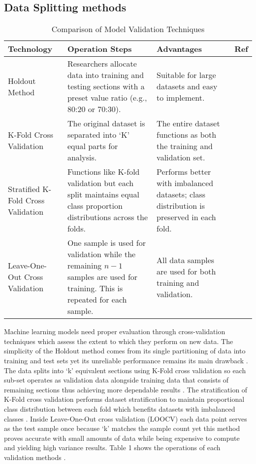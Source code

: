 \documentclass[runningheads]{llncs}
\begin{document}
\subsection{Data Splitting methods}
\begin{table}[h]
\centering
\caption{Comparison of Model Validation Techniques}
\label{tab:model_validation}
\begin{tabular}{|p{3cm}|p{4cm}|p{4cm}|p{1cm}|}
\hline
\textbf{Technology} & \textbf{Operation Steps} & \textbf{Advantages} & \textbf{Ref} \\
\hline
Holdout Method & Researchers allocate data into training and testing sections with a preset value ratio (e.g., 80:20 or 70:30). & Suitable for large datasets and easy to implement. & \cite{kadir2018} \\
\hline
K-Fold Cross Validation & The original dataset is separated into ‘K’ equal parts for analysis. & The entire dataset functions as both the training and validation set. & \cite{qiu2024} \\
\hline
Stratified K-Fold Cross Validation & Functions like K-fold validation but each split maintains equal class proportion distributions across the folds. & Performs better with imbalanced datasets; class distribution is preserved in each fold. & \cite{g2020,kanakaraddi2024} \\
\hline
Leave-One-Out Cross Validation & One sample is used for validation while the remaining \(n-1\) samples are used for training. This is repeated for each sample. & All data samples are used for both training and validation. & \cite{miller2024} \\
\hline
\end{tabular}
\end{table}


Machine learning models need proper evaluation through cross-validation techniques which assess the extent to which they perform on new data. The simplicity of the Holdout method comes from its single partitioning of data into training and test sets yet its unreliable performance remains its main drawback \cite{qiu2024}. The data splits into ‘k’ equivalent sections using K-Fold cross validation so each sub-set operates as validation data alongside training data that consists of remaining sections thus achieving more dependable results \cite{kadir2018,kanakaraddi2024}. The stratification of K-Fold cross validation performs dataset stratification to maintain proportional class distribution between each fold which benefits datasets with imbalanced classes \cite{chen2022,qiu2024}. Inside Leave-One-Out cross validation (LOOCV) each data point serves as the test sample once because ‘k’ matches the sample count yet this method proves accurate with small amounts of data while being expensive to compute and yielding high variance results. Table 1 shows the operations of each validation methods \cite{li2024,sachdeva2024}. 
\end{document}
